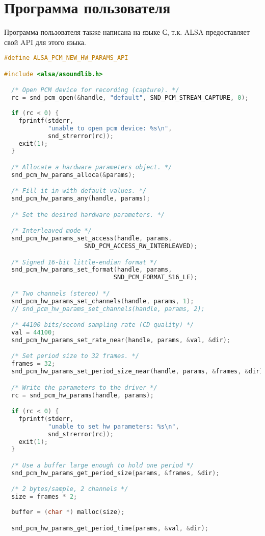 \section{Программа пользователя}

Программа пользователя также написана на языке С, т.к. ALSA предоставляет свой API для этого языка.

\begin{lstlisting}[language=C, caption={Подготовка к считыванию входа микрофона},label=PrepareCapture]
#define ALSA_PCM_NEW_HW_PARAMS_API

#include <alsa/asoundlib.h>

  /* Open PCM device for recording (capture). */
  rc = snd_pcm_open(&handle, "default", SND_PCM_STREAM_CAPTURE, 0);
  
  if (rc < 0) {
    fprintf(stderr,
            "unable to open pcm device: %s\n",
            snd_strerror(rc));
    exit(1);
  }

  /* Allocate a hardware parameters object. */
  snd_pcm_hw_params_alloca(&params);

  /* Fill it in with default values. */
  snd_pcm_hw_params_any(handle, params);

  /* Set the desired hardware parameters. */

  /* Interleaved mode */
  snd_pcm_hw_params_set_access(handle, params,
                      SND_PCM_ACCESS_RW_INTERLEAVED);

  /* Signed 16-bit little-endian format */
  snd_pcm_hw_params_set_format(handle, params,
                              SND_PCM_FORMAT_S16_LE);

  /* Two channels (stereo) */
  snd_pcm_hw_params_set_channels(handle, params, 1);
  // snd_pcm_hw_params_set_channels(handle, params, 2);

  /* 44100 bits/second sampling rate (CD quality) */
  val = 44100;
  snd_pcm_hw_params_set_rate_near(handle, params, &val, &dir);

  /* Set period size to 32 frames. */
  frames = 32;
  snd_pcm_hw_params_set_period_size_near(handle, params, &frames, &dir);

  /* Write the parameters to the driver */
  rc = snd_pcm_hw_params(handle, params);

  if (rc < 0) {
    fprintf(stderr,
            "unable to set hw parameters: %s\n",
            snd_strerror(rc));
    exit(1);
  }

  /* Use a buffer large enough to hold one period */
  snd_pcm_hw_params_get_period_size(params, &frames, &dir);

  /* 2 bytes/sample, 2 channels */
  size = frames * 2; 
  
  buffer = (char *) malloc(size);

  snd_pcm_hw_params_get_period_time(params, &val, &dir);
\end{lstlisting}

